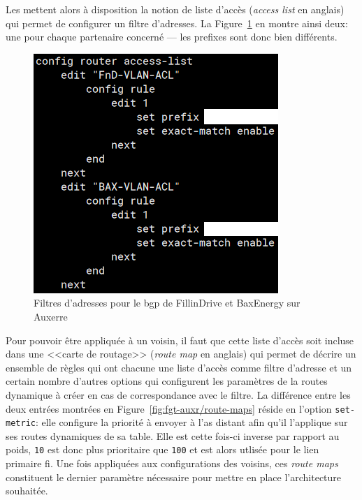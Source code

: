 \documentclass[12pt, oneside, a4paper, titlepage]{report}
\begin{document}
Les  mettent alors à disposition la notion de liste d'accès
(\textit{access list} en anglais) qui permet de configurer un filtre d'adresses.
La Figure~\ref{fig:fgt-auxr/acl} en montre ainsi deux: une pour chaque
partenaire concerné --- les prefixes sont donc bien différents.

\begin{figure}[h!]
    \centering
    \includegraphics[width = 0.6\linewidth]{img/fgt-auxr/acl.png}
    \caption{%
        Filtres d'adresses pour le \gls{bgp} de FillinDrive et BaxEnergy sur
        Auxerre%
    }%
    \label{fig:fgt-auxr/acl}
\end{figure}

Pour pouvoir être appliquée à un voisin, il faut que cette liste d'accès soit
incluse dans une <<carte de routage>> (\textit{route map} en anglais) qui permet
de décrire un ensemble de règles qui ont chacune une liste d'accès comme filtre
d'adresse et un certain nombre d'autres options qui configurent les paramètres
de la routes dynamique à créer en cas de correspondance avec le filtre. La
différence entre les deux entrées montrées en
Figure~\ref{fig:fgt-auxr/route-maps} réside en l'option \texttt{set-metric}:
elle configure la priorité à envoyer à l'\gls{as} distant afin qu'il l'applique
sur ses routes dynamiques de sa table. Elle est cette fois-ci inverse par
rapport au poids, \texttt{10} est donc plus prioritaire que \texttt{100} et est
alors utlisée pour le lien primaire \gls{fi}. Une fois appliquées aux
configurations des voisins, ces \textit{route maps} constituent le dernier
paramètre nécessaire pour mettre en place l'architecture souhaitée.
\end{document}
